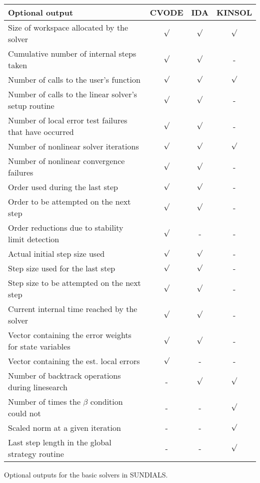 \begin{acmtable}{327pt}
\centering
\begin{tabular}{p{2.75in} c c c }
Optional output & CVODE  & IDA & KINSOL \\
\hline
Size of workspace allocated by the solver & $\surd$ & $\surd$ & $\surd$ \\
Cumulative number of internal steps taken & $\surd$ & $\surd$ & - \\
Number of calls to the user's function & $\surd$ & $\surd$ & $\surd$ \\
Number of calls to the linear solver's setup routine & $\surd$ & $\surd$ & - \\
Number of local error test failures that have occurred & $\surd$ & $\surd$ & - \\
Number of nonlinear solver iterations & $\surd$ & $\surd$ & $\surd$ \\
Number of nonlinear convergence failures & $\surd$ & $\surd$ & - \\
Order used during the last step & $\surd$ & $\surd$ & - \\
Order to be attempted on the next step & $\surd$ & $\surd$ & - \\
Order reductions due to stability limit detection & $\surd$ & - & - \\
Actual initial step size used & $\surd$ & $\surd$ & - \\
Step size used for the last step & $\surd$ & $\surd$ & - \\
Step size to be attempted on the next step & $\surd$ & $\surd$ & - \\
Current internal time reached by the solver & $\surd$ & $\surd$ & - \\
Vector containing the error weights for state variables & $\surd$ & $\surd$ & - \\
Vector containing the est. local errors & $\surd$ & - & - \\
Number of backtrack operations during linesearch & - & $\surd$ & $\surd$ \\
Number of times the $\beta$ condition could not & - & - & $\surd$ \\
Scaled norm at a given iteration & - & - & $\surd$ \\
Last step length in the global strategy routine & - & - & $\surd$ \\
\end{tabular}
\caption{Optional outputs for the basic solvers in SUNDIALS.}
\label{t:optional_output}
\end{acmtable}

